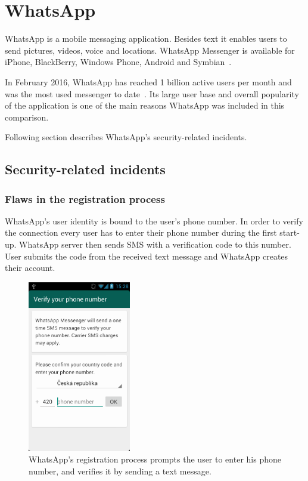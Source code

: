 \documentclass[thesis=M,english]{FITthesis}[2012/10/20]
\begin{document}
\section{WhatsApp}\label{whatsapp}

WhatsApp is a mobile messaging application. Besides text it enables users to send pictures, videos, voice and locations. WhatsApp Messenger is available for iPhone, BlackBerry, Windows Phone, Android and Symbian~\cite{whatsapphomepage}.

In February 2016, WhatsApp has reached 1 billion active users per month and was the most used messenger to date~\cite{whatsappusers}. Its large user base and overall popularity of the application is one of the main reasons WhatsApp was included in this comparison.

Following section describes WhatsApp's security-related incidents.

\subsection{Security-related incidents}

\subsubsection{Flaws in the registration process}\label{whatsapp-registration}

WhatsApp's user identity is bound to the user's phone number. In order to verify the connection every user has to enter their phone number during the first start-up. WhatsApp server then sends SMS with a verification code to this number. User submits the code from the received text message and WhatsApp creates their account.

\begin{figure}[htb]
	\centering
	\includegraphics[width=0.4\textwidth]{whatsapp-registration.png}
	\caption[WhatsApp's registration process]{WhatsApp's registration process prompts the user to enter his phone number, and verifies it by sending a text message.}
	\label{img:whatsapp_reg}
\end{figure}
\end{document}
